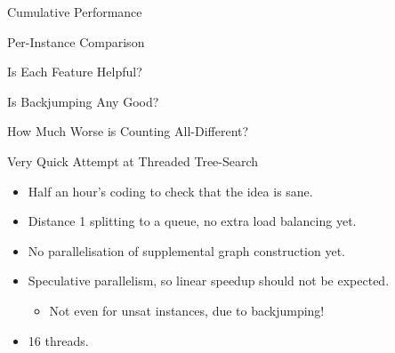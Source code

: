 \documentclass{beamer}
\begin{document}
\begin{frame}{Cumulative Performance}
    
\end{frame}

\begin{frame}{Per-Instance Comparison}
    
\end{frame}

\begin{frame}{Is Each Feature Helpful?}
    
\end{frame}

\begin{frame}{Is Backjumping Any Good?}
    
\end{frame}

\begin{frame}{How Much Worse is Counting All-Different?}
    
\end{frame}

\begin{frame}{Very Quick Attempt at Threaded Tree-Search}
     {
        \begin{itemize}
            \item Half an hour's coding to check that the idea is sane.
            \item Distance 1 splitting to a queue, no extra load balancing yet.
            \item No parallelisation of supplemental graph construction yet.
            \item Speculative parallelism, so linear speedup should not be expected.
                \begin{itemize}
                    \item Not even for unsat instances, due to backjumping!
                \end{itemize}
            \item 16 threads.
        \end{itemize}
    }

     {
        
    }
\end{frame}

\section{}
\end{document}

